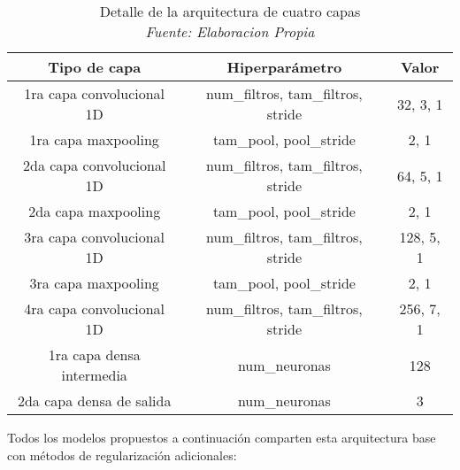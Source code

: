\begin{table}[!ht]
	\centering
	\begin{tabular}{|c|c|c|}
		\hline
		\textbf{Tipo de capa} & \textbf{Hiperparámetro} & \textbf{Valor} \\ \hline
		1ra capa convolucional 1D & num\_filtros, tam\_filtros, stride & 32, 3, 1 \\ \hline
		1ra capa maxpooling & tam\_pool, pool\_stride & 2, 1 \\ \hline
		2da capa convolucional 1D & num\_filtros, tam\_filtros, stride & 64, 5, 1 \\ \hline
		2da capa maxpooling & tam\_pool, pool\_stride & 2, 1 \\ \hline
		3ra capa convolucional 1D & num\_filtros, tam\_filtros, stride & 128, 5, 1 \\ \hline
		3ra capa maxpooling & tam\_pool, pool\_stride & 2, 1 \\ \hline
		4ra capa convolucional 1D & num\_filtros, tam\_filtros, stride & 256, 7, 1 \\ \hline
		1ra capa densa intermedia & num\_neuronas & 128 \\ \hline
		2da capa densa de salida & num\_neuronas & 3 \\ \hline
	\end{tabular}
	\caption[Detalle de la arquitectura de cuatro capas]{Detalle de la arquitectura de cuatro capas
	\\\textit{Fuente: Elaboracion Propia}}
	\label{tbl:9}
\end{table}

Todos los modelos propuestos a continuación comparten esta arquitectura base con métodos de regularización adicionales:

